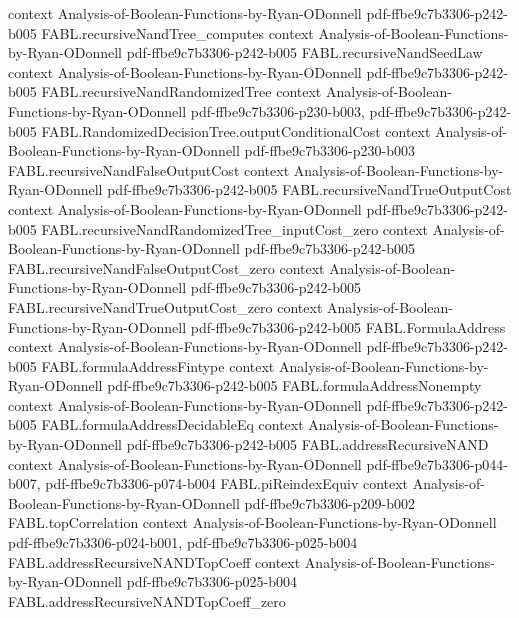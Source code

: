\begin{theorem}
  {context}
  {Analysis-of-Boolean-Functions-by-Ryan-ODonnell}
  {pdf-ffbe9c7b3306-p242-b005}
\proofstep
  {FABL.recursiveNandTree_computes}
  {context}
  {Analysis-of-Boolean-Functions-by-Ryan-ODonnell}
  {pdf-ffbe9c7b3306-p242-b005}
\proofstep
  {FABL.recursiveNandSeedLaw}
  {context}
  {Analysis-of-Boolean-Functions-by-Ryan-ODonnell}
  {pdf-ffbe9c7b3306-p242-b005}
\proofstep
  {FABL.recursiveNandRandomizedTree}
  {context}
  {Analysis-of-Boolean-Functions-by-Ryan-ODonnell}
  {pdf-ffbe9c7b3306-p230-b003,
    pdf-ffbe9c7b3306-p242-b005}
\proofstep
  {FABL.RandomizedDecisionTree.outputConditionalCost}
  {context}
  {Analysis-of-Boolean-Functions-by-Ryan-ODonnell}
  {pdf-ffbe9c7b3306-p230-b003}
\proofstep
  {FABL.recursiveNandFalseOutputCost}
  {context}
  {Analysis-of-Boolean-Functions-by-Ryan-ODonnell}
  {pdf-ffbe9c7b3306-p242-b005}
\proofstep
  {FABL.recursiveNandTrueOutputCost}
  {context}
  {Analysis-of-Boolean-Functions-by-Ryan-ODonnell}
  {pdf-ffbe9c7b3306-p242-b005}
\proofstep
  {FABL.recursiveNandRandomizedTree_inputCost_zero}
  {context}
  {Analysis-of-Boolean-Functions-by-Ryan-ODonnell}
  {pdf-ffbe9c7b3306-p242-b005}
\proofstep
  {FABL.recursiveNandFalseOutputCost_zero}
  {context}
  {Analysis-of-Boolean-Functions-by-Ryan-ODonnell}
  {pdf-ffbe9c7b3306-p242-b005}
\proofstep
  {FABL.recursiveNandTrueOutputCost_zero}
  {context}
  {Analysis-of-Boolean-Functions-by-Ryan-ODonnell}
  {pdf-ffbe9c7b3306-p242-b005}
\proofstep
  {FABL.FormulaAddress}
  {context}
  {Analysis-of-Boolean-Functions-by-Ryan-ODonnell}
  {pdf-ffbe9c7b3306-p242-b005}
\proofstep
  {FABL.formulaAddressFintype}
  {context}
  {Analysis-of-Boolean-Functions-by-Ryan-ODonnell}
  {pdf-ffbe9c7b3306-p242-b005}
\proofstep
  {FABL.formulaAddressNonempty}
  {context}
  {Analysis-of-Boolean-Functions-by-Ryan-ODonnell}
  {pdf-ffbe9c7b3306-p242-b005}
\proofstep
  {FABL.formulaAddressDecidableEq}
  {context}
  {Analysis-of-Boolean-Functions-by-Ryan-ODonnell}
  {pdf-ffbe9c7b3306-p242-b005}
\proofstep
  {FABL.addressRecursiveNAND}
  {context}
  {Analysis-of-Boolean-Functions-by-Ryan-ODonnell}
  {pdf-ffbe9c7b3306-p044-b007,
    pdf-ffbe9c7b3306-p074-b004}
\proofstep
  {FABL.piReindexEquiv}
  {context}
  {Analysis-of-Boolean-Functions-by-Ryan-ODonnell}
  {pdf-ffbe9c7b3306-p209-b002}
\proofstep
  {FABL.topCorrelation}
  {context}
  {Analysis-of-Boolean-Functions-by-Ryan-ODonnell}
  {pdf-ffbe9c7b3306-p024-b001,
    pdf-ffbe9c7b3306-p025-b004}
\proofstep
  {FABL.addressRecursiveNANDTopCoeff}
  {context}
  {Analysis-of-Boolean-Functions-by-Ryan-ODonnell}
  {pdf-ffbe9c7b3306-p025-b004}
\proofstep
  {FABL.addressRecursiveNANDTopCoeff_zero}

\end{theorem}
